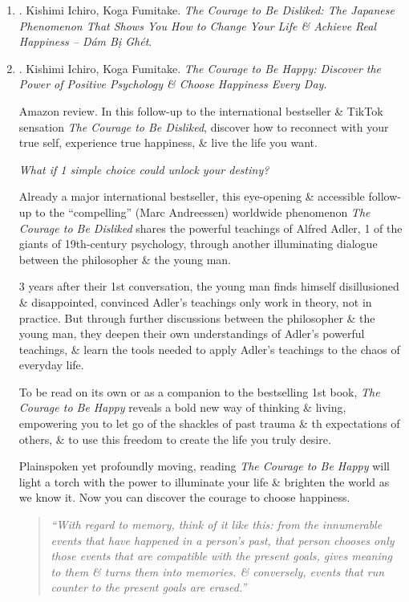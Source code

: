 \documentclass{article}
\begin{document}
\begin{enumerate}
	\item \cite{Ichiro_Fumitake_disliked_VN}. {\sc Kishimi Ichiro, Koga Fumitake}. {\it The Courage to Be Disliked: The Japanese Phenomenon That Shows You How to Change Your Life \& Achieve Real Happiness -- Dám Bị Ghét}.\hfill{\sf[done]}
	
	\item \cite{Ichiro_Fumitake_happy}. {\sc Kishimi Ichiro, Koga Fumitake}. {\it The Courage to Be Happy: Discover the Power of Positive Psychology \& Choose Happiness Every Day}. {}
	
	{\sf Amazon review.} In this follow-up to the international bestseller \& TikTok sensation {\it The Courage to Be Disliked}, discover how to reconnect with your true self, experience true happiness, \& live the life you want.
	
	{\it What if 1 simple choice could unlock your destiny?}
	
	Already a major international bestseller, this eye-opening \& accessible follow-up to the ``compelling'' ({\sc Marc Andreessen}) worldwide phenomenon {\it The Courage to Be Disliked} shares the powerful teachings of {\sc Alfred Adler}, 1 of the giants of 19th-century psychology, through another illuminating dialogue between the philosopher \& the young man.
	
	3 years after their 1st conversation, the young man finds himself disillusioned \& disappointed, convinced {\sc Adler}'s teachings only work in theory, not in practice. But through further discussions between the philosopher \& the young man, they deepen their own understandings of {\sc Adler}'s powerful teachings, \& learn the tools needed to apply {\sc Adler}'s teachings to the chaos of everyday life.
	
	To be read on its own or as a companion to the bestselling 1st book, {\it The Courage to Be Happy} reveals a bold new way of thinking \& living, empowering you to let go of the shackles of past trauma \& th expectations of others, \& to use this freedom to create the life you truly desire.
	
	Plainspoken yet profoundly moving, reading {\it The Courage to Be Happy} will light a torch with the power to illuminate your life \& brighten the world as we know it. Now you can discover the courage to choose happiness.
	\begin{quotation}
		{\it``With regard to memory, think of it like this: from the innumerable events that have happened in a person's past, that person chooses only those events that are compatible with the present goals, gives meaning to them \& turns them into memories. \& conversely, events that run counter to the present goals are erased.''}
		

\end{quotation}
\end{enumerate}
\end{document}
